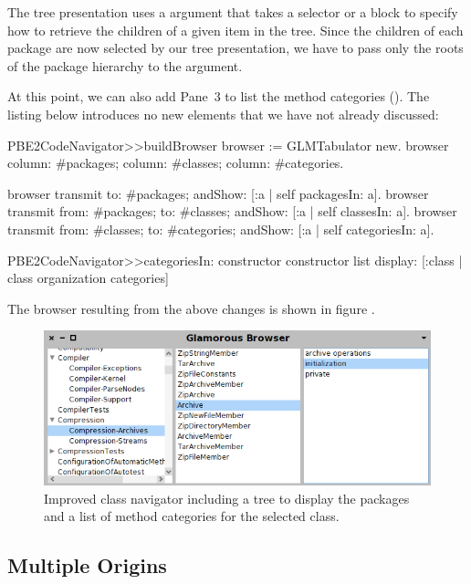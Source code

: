 \documentclass[a4paper,10pt,twoside]{book}
\begin{document}
The tree presentation uses a  argument that takes a
selector or a block to specify how to retrieve the children of a
given item in the tree. Since the children of each package are now
selected by our tree presentation, we have to pass only the roots of
the package hierarchy to the  argument.

At this point, we can also add Pane~3 to list the method categories (). The listing
below introduces no new elements that we have not already discussed:

\begin{code}{}
PBE2CodeNavigator>>buildBrowser 
  browser := GLMTabulator new.
  browser
    column: #packages;
    column: #classes;
    column: #categories. 

  browser transmit to: #packages; andShow: [:a | self packagesIn: a].
  browser transmit from: #packages; to: #classes; andShow: [:a | self classesIn: a].
  browser transmit from: #classes; to: #categories; andShow: [:a | self categoriesIn: a].

PBE2CodeNavigator>>categoriesIn: constructor
  constructor list
    display:  [:class | class organization categories]  
\end{code}


The browser resulting from the above changes is shown in
figure .

\begin{figure}[htbp]
\centerline{\includegraphics[width=\linewidth]{treeandcategories.png}}
\caption{Improved class navigator including a tree to display the packages and a list of method categories for the selected class.}
\label{fig:treeandcategories}
\end{figure}


\subsection{Multiple Origins}
\end{document}
